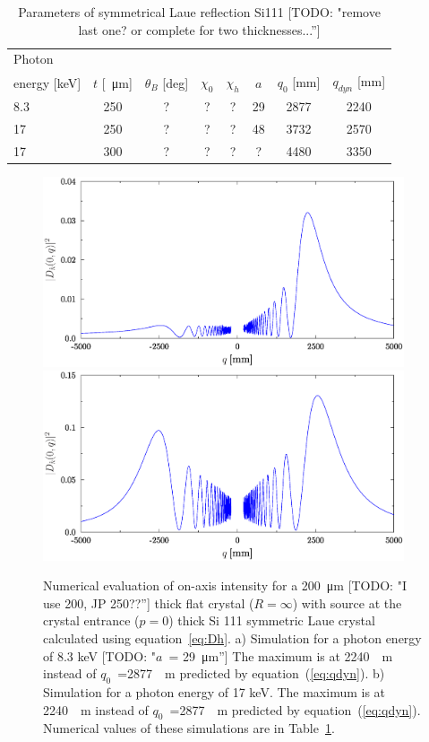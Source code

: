 \documentclass[preprint]{iucr}              %
\newcommand{\todo}[1]{{\color{red}[TODO: "#1'']}}
\begin{document}
\begin{table}
\caption{Parameters of symmetrical Laue reflection Si111 \todo{remove last one? or complete for two thicknesses...}}
\begin{tabular}{lccccccc}      %
 Photon \\energy  [keV]  & $t$ [\SI{}{\micro\meter}]& $\theta_B$ [deg]       & $\chi_0$ & $\chi_h$ & $a$ & $q_0$ [mm] & $q_{dyn}$  [mm] \\
\hline
 8.3  & 250 & ? & ? & ?  & 29  & 2877  & 2240   \\
 17   & 250 & ? & ? & ?  & 48  & 3732  & 2570   \\
 17    & 300 & ? & ? & ?  & ?  & 4480  & 3350 \\
\end{tabular}
\label{table:example}
\end{table}


\begin{figure}
\label{fig:flatLaue}
\caption{Numerical evaluation of on-axis intensity for a  \SI{200}{\micro\meter} \todo{I use 200, JP 250??}  thick flat crystal ($R=\infty$) with source at the crystal entrance ($p=0$) thick Si 111 symmetric Laue crystal calculated using equation~\ref{eq:Dh}.
a) Simulation for a photon energy of 8.3 keV \todo{$a$~= \SI{29}{\micro\meter}}
The maximum is at \SI{2240}{\mili\meter} instead of $q_0$~=\SI{2877}{\mili\meter} predicted by equation~(\ref{eq:qdyn}).
b) Simulation for a photon energy of 17 keV.
The maximum is at \SI{2240}{\mili\meter} instead of $q_0$~=\SI{2877}{\mili\meter} predicted by equation~(\ref{eq:qdyn}).
Numerical values of these simulations are in Table~\ref{table:example}.
}
\includegraphics[width=0.95\textwidth]{flat8keV.eps}
\includegraphics[width=0.95\textwidth]{flat17keV.eps}
\end{figure}
\end{document}
